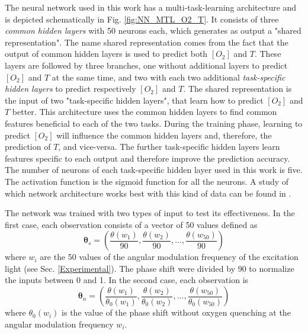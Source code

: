 \documentclass[final,5p,times,twocolumn]{elsarticle}
\begin{document}
The neural network used in this work has a multi-task-learning architecture and is depicted schematically in Fig. \ref{fig:NN_MTL_O2_T}. It consists of three {\sl common hidden layers} with 50 neurons each, which generates as output a "shared representation". The name shared representation comes from the fact that the output of common hidden layers is used to predict both $[O_2]$ and $T$. These layers are followed by three branches, one without additional layers to predict $[O_2]$ and $T$ at the same time, and two with each two additional {\sl task-specific hidden layers} to predict respectively $[O_2]$ and $T$. The shared representation is the input of two "task-specific hidden layers", that learn how to predict $[O_2]$ and $T$ better. This architecture uses the common hidden layers to find common features beneficial to each of the two tasks. During the training phase, learning to predict $[O_2]$ will influence the common hidden layers and, therefore, the prediction of $T$, and vice-versa. The further task-specific hidden layers learn features specific to each output and therefore improve the prediction accuracy. The number of neurons of each task-specific hidden layer used in this work is five. The activation function is the sigmoid function for all the neurons.  A study of which network architecture works best with this kind of data can be found in \cite{Michelucci2019_2}.

The network was trained with two types of input to test its effectiveness. In the first case, each observation consists of a vector of 50 values defined as
\begin{equation}
\label{input1}
{\pmb \theta}_s = \left(
\frac{\theta(w_1)}{90} , \frac{\theta(w_2)}{90} , ..., \frac{\theta(w_{50})}{90} 
\right)
\end{equation}
where $w_i$ are the 50 values of the angular modulation frequency of the excitation light (see Sec. \ref{Experimental}). The phase shift were divided by 90 to normalize the inputs between 0 and 1. In the second case, each observation is
\begin{equation}
\label{input2}
{\pmb \theta}_n = \left(
\frac{\theta(w_1)}{\theta_0(w_1)} , \frac{\theta(w_2)}{\theta_0(w_2)} , ..., \frac{\theta(w_{50})}{\theta_0(w_{50})} 
\right)
\end{equation}
where $\theta_0(w_i)$ is the value of the phase shift without oxygen quenching at the angular modulation frequency $w_i$.
\end{document}
